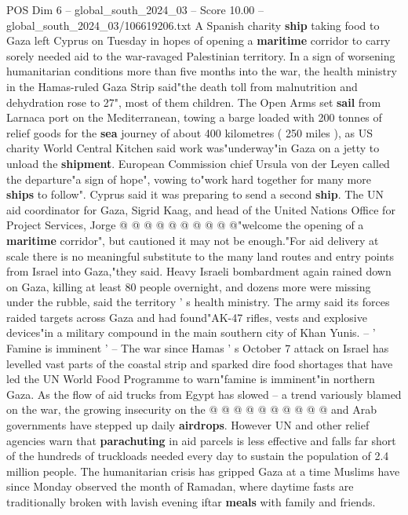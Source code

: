 \begin{textsample}{POS Dim 6 – global\_south\_2024\_03 – Score 10.00 – global\_south\_2024\_03/106619206.txt}  \label{ex:f6_pos_064}
A Spanish charity \textbf{ship} taking food to Gaza left Cyprus on Tuesday in hopes of opening a \textbf{maritime} corridor to carry sorely needed aid to the war-ravaged Palestinian territory.
In a sign of worsening humanitarian conditions more than five months into the war, the health ministry in the Hamas-ruled Gaza Strip said"the death toll from malnutrition and dehydration rose to 27", most of them children.
The Open Arms set \textbf{sail} from Larnaca port on the Mediterranean, towing a barge loaded with 200 tonnes of relief goods for the \textbf{sea} journey of about 400 kilometres ( 250 miles ), as US charity World Central Kitchen said work was"underway"in Gaza on a jetty to unload the \textbf{shipment}.
European Commission chief Ursula von der Leyen called the departure"a sign of hope", vowing to"work hard together for many more \textbf{ships} to follow".
Cyprus said it was preparing to send a second \textbf{ship}.
The UN aid coordinator for Gaza, Sigrid Kaag, and head of the United Nations Office for Project Services, Jorge @ @ @ @ @ @ @ @ @ @"welcome the opening of a \textbf{maritime} corridor", but cautioned it may not be enough."For aid delivery at scale there is no meaningful substitute to the many land routes and entry points from Israel into Gaza,"they said.
Heavy Israeli bombardment again rained down on Gaza, killing at least 80 people overnight, and dozens more were missing under the rubble, said the territory ' s health ministry.
The army said its forces raided targets across Gaza and had found"AK-47 rifles, vests and explosive devices"in a military compound in the main southern city of Khan Yunis. -- ' Famine is imminent ' -- The war since Hamas ' s October 7 attack on Israel has levelled vast parts of the coastal strip and sparked dire food shortages that have led the UN World Food Programme to warn"famine is imminent"in northern Gaza.
As the flow of aid trucks from Egypt has slowed -- a trend variously blamed on the war, the growing insecurity on the @ @ @ @ @ @ @ @ @ @ and Arab governments have stepped up daily \textbf{airdrops}.
However UN and other relief agencies warn that \textbf{parachuting} in aid parcels is less effective and falls far short of the hundreds of truckloads needed every day to sustain the population of 2.4 million people.
The humanitarian crisis has gripped Gaza at a time Muslims have since Monday observed the month of Ramadan, where daytime fasts are traditionally broken with lavish evening iftar \textbf{meals} with family and friends.

\end{textsample}
